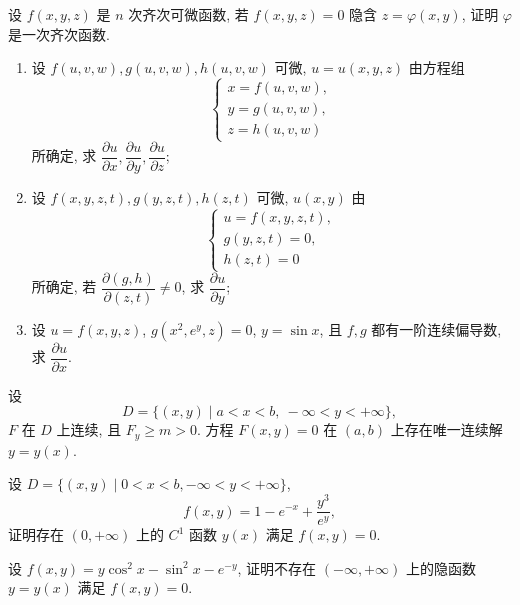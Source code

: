 \documentclass[../../数学分析培优讲义.tex]{subfiles}
\begin{document}
\begin{example}
设 $f(x,y,z)$ 是 $n$ 次齐次可微函数, 若 $f(x,y,z)=0$ 隐含 $z=\varphi(x,y)$, 证明 $\varphi$ 是一次齐次函数.
\end{example}
\exampleblank

\begin{example}
\begin{enumerate}[label=(\arabic*)]
    \item 设 $f(u,v,w),g(u,v,w),h(u,v,w)$ 可微, $u=u(x,y,z)$ 由方程组
    \[
        \begin{cases}
            x=f(u,v,w),\\
            y=g(u,v,w),\\
            z=h(u,v,w)
        \end{cases}
    \]
    所确定, 求 $\dfrac{\partial u}{\partial x},\dfrac{\partial u}{\partial y},\dfrac{\partial u}{\partial z}$;
    \item 设 $f(x,y,z,t),g(y,z,t),h(z,t)$ 可微, $u(x,y)$ 由
    \[
        \begin{cases}
            u=f(x,y,z,t),\\
            g(y,z,t)=0,\\
            h(z,t)=0
        \end{cases}
    \]
    所确定, 若 $\dfrac{\partial(g,h)}{\partial(z,t)}\ne0$, 求 $\dfrac{\partial u}{\partial y}$;
    \item 设 $u=f(x,y,z)$, $g(x^2,e^y,z)=0$, $y=\sin x$, 且 $f,g$ 都有一阶连续偏导数, 求 $\dfrac{\partial u}{\partial x}$.
\end{enumerate}
\end{example}
\exampleblank




\begin{proposition}
设
\[
    D=\{(x,y)\mid a<x<b,\ -\infty<y<+\infty\},
\]
$F$ 在 $D$ 上连续, 且 $F_y\geq m>0$. 方程 $F(x,y)=0$ 在 $(a,b)$ 上存在唯一连续解 $y=y(x)$.
\end{proposition}

\begin{example}
设 $D=\{(x,y)\mid0<x<b,-\infty<y<+\infty\}$,
\[
    f(x,y)=1-e^{-x}+\dfrac{y^3}{e^y},
\]
证明存在 $(0,+\infty)$ 上的 $C^1$ 函数 $y(x)$ 满足 $f(x,y)=0$.
\end{example}
\exampleblank

\begin{example}
设 $f(x,y)=y\cos^2x-\sin^2x-e^{-y}$, 证明不存在 $(-\infty,+\infty)$ 上的隐函数 $y=y(x)$ 满足 $f(x,y)=0$.
\end{example}
\exampleblank
\end{document}
